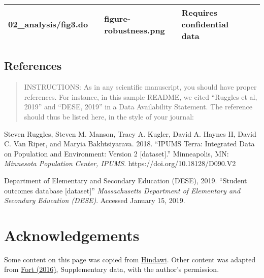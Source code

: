 \documentclass[
]{article}
\begin{document}
\begin{longtable}[]{@{}lllll@{}}
\begin{minipage}[t]{0.18\columnwidth}
02\_analysis/fig3.do\strut
\end{minipage} & \begin{minipage}[t]{0.09\columnwidth}\raggedright
\strut
\end{minipage} & \begin{minipage}[t]{0.23\columnwidth}\raggedright
figure-robustness.png\strut
\end{minipage} & \begin{minipage}[t]{0.23\columnwidth}\raggedright
Requires confidential data\strut
\end{minipage}\tabularnewline
\bottomrule
\end{longtable}

\hypertarget{references}{%
\subsection{References}\label{references}}

\begin{quote}
INSTRUCTIONS: As in any scientific manuscript, you should have proper
references. For instance, in this sample README, we cited ``Ruggles et
al, 2019'' and ``DESE, 2019'' in a Data Availability Statement. The
reference should thus be listed here, in the style of your journal:
\end{quote}

Steven Ruggles, Steven M. Manson, Tracy A. Kugler, David A. Haynes II,
David C. Van Riper, and Maryia Bakhtsiyarava. 2018. ``IPUMS Terra:
Integrated Data on Population and Environment: Version 2
{[}dataset{]}.'' Minneapolis, MN: \emph{Minnesota Population Center,
IPUMS}. https://doi.org/10.18128/D090.V2

Department of Elementary and Secondary Education (DESE), 2019. ``Student
outcomes database {[}dataset{]}'' \emph{Massachusetts Department of
Elementary and Secondary Education (DESE)}. Accessed January 15, 2019.

\hypertarget{acknowledgements}{%
\section{Acknowledgements}\label{acknowledgements}}

Some content on this page was copied from
\href{https://www.hindawi.com/research.data/\#statement.templates}{Hindawi}.
Other content was adapted from
\href{https://doi.org/10.1093/restud/rdw057}{Fort (2016)}, Supplementary
data, with the author's permission.
\end{document}
